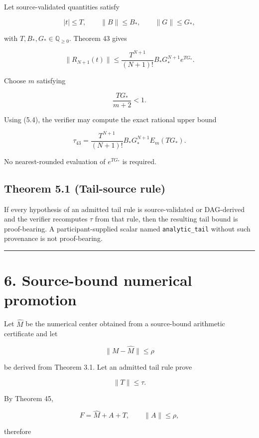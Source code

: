 Let source-validated quantities satisfy

\[
|t|\le T,
\qquad
\|B\|\le B_*,
\qquad
\|G\|\le G_*,
\]

with \(T,B_*,G_*\in\mathbb Q_{\ge0}\). Theorem 43 gives

\[
\|R_{N+1}(t)\|
\le
\frac{T^{N+1}}{(N+1)!}
B_*G_*^{N+1}e^{TG_*}.
\]

Choose \(m\) satisfying

\[
\frac{TG_*}{m+2}<1.
\]

Using (5.4), the verifier may compute the exact rational upper bound

\[
\boxed{
\tau_{43}
=
\frac{T^{N+1}}{(N+1)!}
B_*G_*^{N+1}E_m(TG_*).
}
\tag{5.5}
\]

No nearest-rounded evaluation of \(e^{TG_*}\) is required.

\hypertarget{theorem-5.1-tail-source-rule}{%
\subsection{Theorem 5.1 (Tail-source rule)}\label{theorem-5.1-tail-source-rule}}

If every hypothesis of an admitted tail rule is source-validated or DAG-derived and the verifier recomputes \(\tau\) from that rule, then the resulting tail bound is proof-bearing. A participant-supplied scalar named \texttt{analytic\_tail} without such provenance is not proof-bearing.

\begin{center}\rule{0.5\linewidth}{0.5pt}\end{center}

\hypertarget{source-bound-numerical-promotion}{%
\section{6. Source-bound numerical promotion}\label{source-bound-numerical-promotion}}

Let \(\widehat M\) be the numerical center obtained from a source-bound arithmetic certificate and let

\[
\|M-\widehat M\|\le\rho
\tag{6.1}
\]

be derived from Theorem 3.1. Let an admitted tail rule prove

\[
\|T\|\le\tau.
\tag{6.2}
\]

By Theorem 45,

\[
F=\widehat M+A+T,
\qquad
\|A\|\le\rho,
\]

therefore

